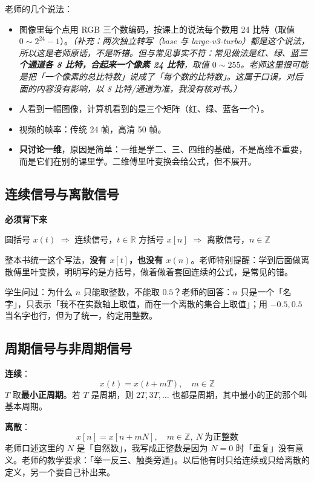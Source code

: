 \documentclass[UTF8,a4paper,11pt]{ctexart}
\newenvironment{remember}{\begin{rememberbox}\textbf{必须背下来}\par\smallskip}{\end{rememberbox}}
\begin{document}
\medskip
老师的几个说法：
\begin{itemize}[nosep]
\item 图像里每个点用 RGB 三个数编码，按课上的说法每个数用 24 比特（取值 $0\sim 2^{24}-1$）。\emph{（补充：两次独立转写（base 与 large-v3-turbo）都是这个说法，所以这是老师原话，不是听错。但与常见事实不符：常见做法是红、绿、蓝\textbf{三个通道各 8 比特，合起来一个像素 24 比特}，取值 $0\sim255$。老师这里很可能是把「一个像素的总比特数」说成了「每个数的比特数」。这属于口误，对后面的内容没有影响，以 8 比特/通道为准，我没有核对书。）}
\item 人看到一幅图像，计算机看到的是三个矩阵（红、绿、蓝各一个）。
\item 视频的帧率：传统 24 帧，高清 50 帧。
\item \textbf{只讨论一维}，原因是简单：一维是学二、三、四维的基础，不是高维不重要，而是它们在别的课里学。二维傅里叶变换会给公式，但不展开。
\end{itemize}

\subsection{连续信号与离散信号}
\begin{remember}
\begin{center}
圆括号 $x(t)$ $\Rightarrow$ 连续信号，$t\in\mathbb{R}$\qquad\qquad
方括号 $x[n]$ $\Rightarrow$ 离散信号，$n\in\mathbb{Z}$
\end{center}
整本书统一这个写法，\textbf{没有 $x[t]$，也没有 $x(n)$}。老师特别提醒：学到后面做离散傅里叶变换，明明写的是方括号，做着做着套回连续的公式，是常见的错。
\end{remember}

学生问过：为什么 $n$ 只能取整数，不能取 $0.5$？老师的回答：$n$ 只是一个「名字」，只表示「我不在实数轴上取值，而在一个离散的集合上取值」；用 $-0.5,0.5$ 当名字也行，但为了统一，约定用整数。

\subsection{周期信号与非周期信号}
\textbf{连续}：
\[
x(t)=x(t+mT),\quad m\in\mathbb{Z}
\]
$T$ 取\textbf{最小正周期}。若 $T$ 是周期，则 $2T,3T,\dots$ 也都是周期，其中最小的正的那个叫基本周期。

\textbf{离散}：
\[
x[n]=x[n+mN],\quad m\in\mathbb{Z},\ N\ \text{为正整数}
\]
老师口述这里的 $N$ 是「自然数」，我写成正整数是因为 $N=0$ 时「重复」没有意义。老师的教学要求：「举一反三、触类旁通」。以后他有时只给连续或只给离散的定义，另一个要自己补出来。
\end{document}
